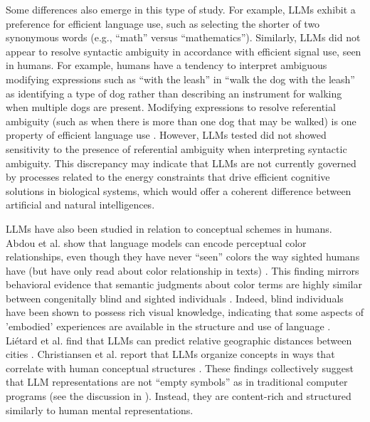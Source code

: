 Some differences also emerge in this type of study.  For example, LLMs exhibit a preference for efficient language use, such as selecting the shorter of two synonymous words (e.g., ``math'' versus ``mathematics''). Similarly,  LLMs did not appear to resolve syntactic ambiguity in accordance with efficient signal use, seen in humans. For example, humans have a tendency to interpret ambiguous modifying expressions such as ``with the leash'' in ``walk the dog with the leash'' as identifying a type of dog rather than describing an instrument for walking when multiple dogs are present. Modifying expressions to resolve referential ambiguity (such as when there is more than one dog that may be walked) is one property of efficient language use \cite{frank2012predicting}. However, LLMs tested did not showed sensitivity to the presence of referential ambiguity when interpreting syntactic ambiguity. This discrepancy may indicate that LLMs are not currently governed by processes related to the energy constraints that drive efficient cognitive solutions in biological systems, which would offer a coherent difference between artificial and natural intelligences.

LLMs have also been studied in relation to conceptual schemes in humans. Abdou et al. show that language models can encode perceptual color relationships, even though they have never ``seen'' colors the way sighted humans have (but have only read about color relationship in texts) \cite{abdou2021can}. This finding mirrors behavioral evidence that semantic judgments about color terms are highly similar between congenitally blind and sighted individuals \cite{marmor1978age, saysani2018colour}. Indeed, blind individuals have been shown to possess rich visual knowledge, indicating that some aspects of 'embodied' experiences are available in the structure and use of language \cite{kim2019knowledge, liu2025learning}. Liétard et al. find that LLMs can predict relative geographic distances between cities \cite{lietard2021do}. Christiansen et al. report that LLMs organize concepts in ways that correlate with human conceptual structures \cite{christiansen2023large}. These findings collectively suggest that LLM representations are not ``empty symbols'' as in traditional computer programs (see the discussion in ). Instead, they are content-rich and structured similarly to human mental representations.

